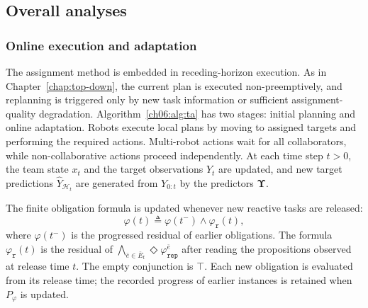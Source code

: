 
\subsection{Overall analyses}
\label{ch06:subsec:execution}

\subsubsection{Online execution and adaptation}

The assignment method is embedded in receding-horizon execution. As in
Chapter~\ref{chap:top-down}, the current plan is executed non-preemptively,
and replanning is triggered only by new task information or sufficient
assignment-quality degradation. Algorithm~\ref{ch06:alg:ta} has two stages:
initial planning and online adaptation.  Robots execute local plans by moving to
assigned targets and performing the required actions. Multi-robot actions wait
for all collaborators, while non-collaborative actions proceed independently.
At each time step $t>0$, the team state $x_t$ and the target
observations $Y_t$ are updated, and new target predictions
$\widehat{Y}_{\mathcal{H}_t}$ are generated from $Y_{0:t}$ by the
predictors $\mathbf{\Upsilon}$.
\begin{revision}
The finite obligation formula is updated whenever new reactive tasks are released:
\begin{equation}
\label{ch06:eq:task-update}
\varphi(t) \triangleq \varphi(t^{-}) \wedge \varphi_{\texttt{r}}(t),
\end{equation}
where $\varphi(t^-)$ is the progressed residual of earlier obligations.
The formula $\varphi_{\texttt r}(t)$ is the residual of
$\bigwedge_{\bar e\in\bar E_t}\Diamond\varphi_{\texttt{rep}}^{\bar e}$
after reading the propositions observed at release time $t$.
The empty conjunction is $\top$.
Each new obligation is evaluated from its release time; the recorded progress
of earlier instances is retained when $P_\varphi$ is updated.
\end{revision}

